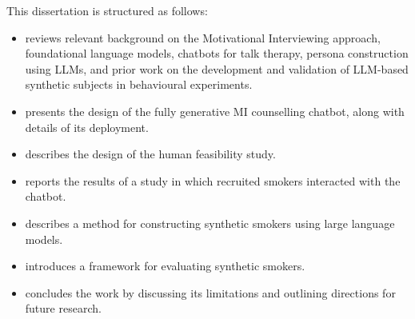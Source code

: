 This dissertation is structured as follows:
\begin{itemize}
	\item {} reviews relevant background on the Motivational Interviewing approach, foundational language models, chatbots for talk therapy, persona construction using LLMs, and prior work on the development and validation of LLM-based synthetic subjects in behavioural experiments.
	\item {} presents the design of the fully generative MI counselling chatbot, along with details of its deployment.
	\item {} describes the design of the human feasibility study.
	\item {} reports the results of a study in which recruited smokers interacted with the chatbot.
	\item {} describes a method for constructing synthetic smokers using large language models.
	\item {} introduces a framework for evaluating synthetic smokers.
	\item {} concludes the work by discussing its limitations and outlining directions for future research.
\end{itemize}

